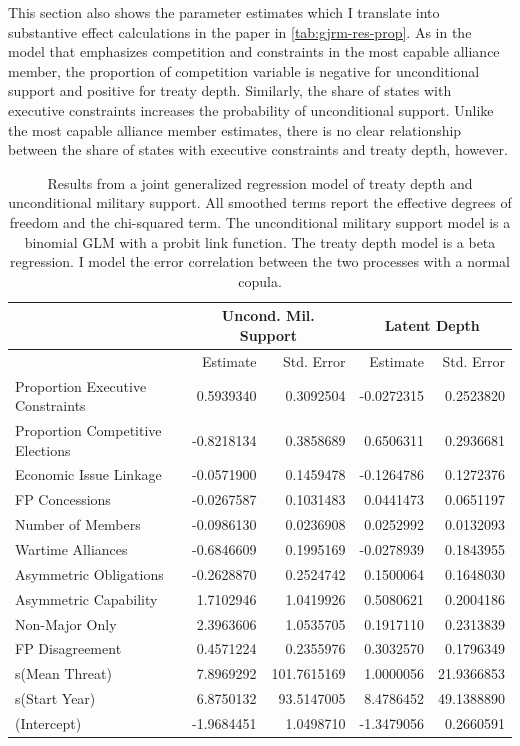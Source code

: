 \documentclass[12pt]{article}
\begin{document}
This section also shows the parameter estimates which I translate into substantive effect calculations in the paper in \autoref{tab:gjrm-res-prop}. 
As in the model that emphasizes competition and constraints in the most capable alliance member, the proportion of competition variable is negative for unconditional support and positive for treaty depth. 
Similarly, the share of states with executive constraints increases the probability of unconditional support.
Unlike the most capable alliance member estimates, there is no clear relationship between the share of states with executive constraints and treaty depth, however. 


\begin{table}[ht]
\centering
\begin{tabular}{lrrrr}
  & \multicolumn{2}{c}{Uncond. Mil. Support} & \multicolumn{2}{c}{Latent Depth}\\ \hline
 & Estimate & Std. Error & Estimate & Std. Error \\ 
  \hline
  Proportion Executive Constraints & 0.5939340 & 0.3092504 & -0.0272315 & 0.2523820 \\ 
  Proportion Competitive Elections & -0.8218134 & 0.3858689 & 0.6506311 & 0.2936681 \\ 
  Economic Issue Linkage & -0.0571900 & 0.1459478 & -0.1264786 & 0.1272376 \\ 
  FP Concessions & -0.0267587 & 0.1031483 & 0.0441473 & 0.0651197 \\ 
  Number of Members & -0.0986130 & 0.0236908 & 0.0252992 & 0.0132093 \\ 
  Wartime Alliances & -0.6846609 & 0.1995169 & -0.0278939 & 0.1843955 \\ 
  Asymmetric Obligations & -0.2628870 & 0.2524742 & 0.1500064 & 0.1648030 \\ 
  Asymmetric Capability & 1.7102946 & 1.0419926 & 0.5080621 & 0.2004186 \\ 
  Non-Major Only & 2.3963606 & 1.0535705 & 0.1917110 & 0.2313839 \\ 
  FP Disagreement & 0.4571224 & 0.2355976 & 0.3032570 & 0.1796349 \\ 
  s(Mean Threat) & 7.8969292 & 101.7615169 & 1.0000056 & 21.9366853 \\ 
  s(Start Year) & 6.8750132 & 93.5147005 & 8.4786452 & 49.1388890 \\ 
  (Intercept) & -1.9684451 & 1.0498710 & -1.3479056 & 0.2660591 \\ 
   \hline
\end{tabular}
\caption{Results from a joint generalized regression model of treaty depth and unconditional military support. 
                     All smoothed terms report the effective degrees of freedom and the chi-squared term. 
                     The unconditional military support model is a binomial GLM with a probit link function. 
                     The treaty depth model is a beta regression. 
                     I model the error correlation between the two processes with a normal copula.} 
\label{tab:gjrm-res-prop}
\end{table}
\end{document}
